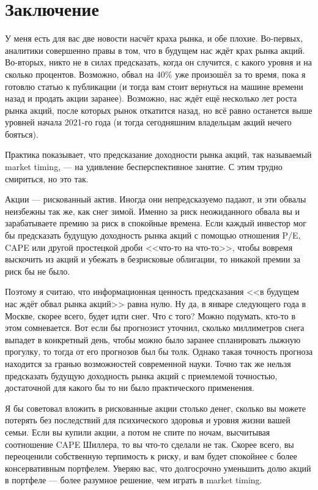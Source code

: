 \section*{Заключение}

У меня есть для вас две новости насчёт краха рынка, и обе плохие. Во-первых, аналитики совершенно правы в том, что в будущем нас ждёт крах рынка акций. Во-вторых, никто не в силах предсказать, когда он случится, с какого уровня и на сколько процентов. Возможно, обвал на 40\% уже произошёл за то время, пока я готовлю статью к публикации (и тогда вам стоит вернуться на машине времени назад и продать акции заранее). Возможно, нас ждёт ещё несколько лет роста рынка акций, после которых рынок откатится назад, но всё равно останется выше уровней начала 2021-го года (и тогда сегодняшним владельцам акций нечего бояться).

Практика показывает, что предсказание доходности рынка акций, так называемый market timing, --- на удивление бесперспективное занятие. С этим трудно смириться, но это так.

Акции --- рискованный актив. Иногда они непредсказуемо падают, и эти обвалы неизбежны так же, как снег зимой. Именно за риск неожиданного обвала вы и зарабатываете премию за риск в спокойные времена. Если каждый инвестор мог бы предсказать будущую доходность рынка акций с помощью отношения P/E, CAPE или другой простецкой дроби <<что-то на что-то>>, чтобы вовремя выскочить из акций и убежать в безрисковые облигации, то никакой премии за риск бы не было.

Поэтому я считаю, что информационная ценность предсказания <<в будущем нас ждёт обвал рынка акций>> равна нулю. Ну да, в январе следующего года в Москве, скорее всего, будет идти снег. Что с того? Можно подумать, кто-то в этом сомневается. Вот если бы прогнозист уточнил, сколько миллиметров снега выпадет в конкретный день, чтобы можно было заранее спланировать лыжную прогулку, то тогда от его прогнозов был бы толк. Однако такая точность прогноза находится за гранью возможностей современной науки. Точно так же нельзя предсказать будущую доходность рынка акций с приемлемой точностью, достаточной для какого бы то ни было практического применения.

Я бы советовал вложить в рискованные акции столько денег, сколько вы можете потерять без  последствий для психического здоровья и уровня жизни вашей семьи. Если вы купили акции, а потом не спите по ночам, высчитывая соотношение CAPE Шиллера, то вы что-то сделали не так. Скорее всего, вы переоценили собственную терпимость к риску, и вам будет спокойнее с более консервативным портфелем. Уверяю вас, что долгосрочно уменьшить долю акций в портфеле --- более разумное решение, чем играть в market timing.

